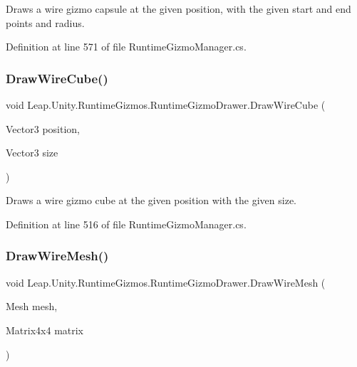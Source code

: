 Draws a wire gizmo capsule at the given position, with the given start and end points and radius. 



Definition at line 571 of file Runtime\+Gizmo\+Manager.\+cs.

\mbox{\label{class_leap_1_1_unity_1_1_runtime_gizmos_1_1_runtime_gizmo_drawer_a21e5f710bde78731cd5061a45b3869c6}} 
\subsubsection{\texorpdfstring{DrawWireCube()}{DrawWireCube()}}
{\footnotesize\ttfamily void Leap.\+Unity.\+Runtime\+Gizmos.\+Runtime\+Gizmo\+Drawer.\+Draw\+Wire\+Cube (\begin{DoxyParamCaption}\item[{Vector3}]{position,  }\item[{Vector3}]{size }\end{DoxyParamCaption})}



Draws a wire gizmo cube at the given position with the given size. 



Definition at line 516 of file Runtime\+Gizmo\+Manager.\+cs.

\mbox{\label{class_leap_1_1_unity_1_1_runtime_gizmos_1_1_runtime_gizmo_drawer_af700d140db83b67ab51956c436a76e82}} 
\subsubsection{\texorpdfstring{DrawWireMesh()}{DrawWireMesh()}\hspace{0.1cm}{\footnotesize\ttfamily [1/2]}}
{\footnotesize\ttfamily void Leap.\+Unity.\+Runtime\+Gizmos.\+Runtime\+Gizmo\+Drawer.\+Draw\+Wire\+Mesh (\begin{DoxyParamCaption}\item[{Mesh}]{mesh,  }\item[{Matrix4x4}]{matrix }\end{DoxyParamCaption})}




